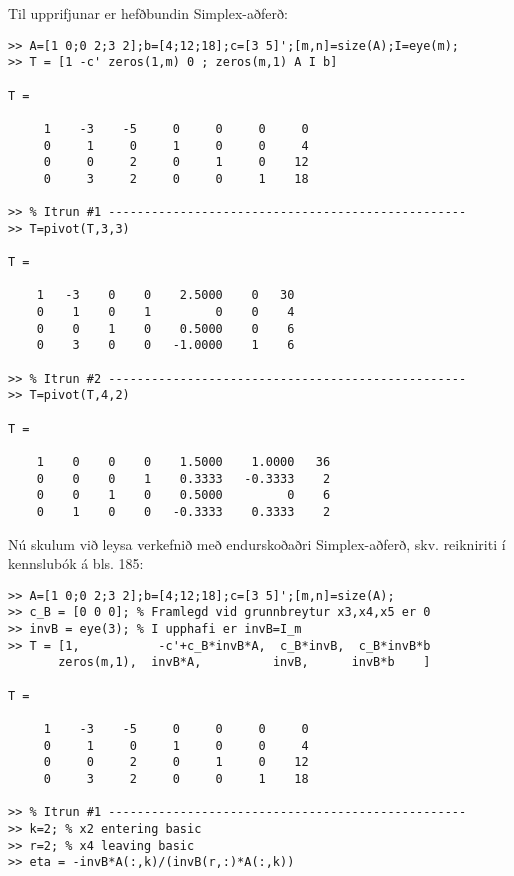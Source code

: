 \begin{lausn}

Til upprifjunar er hefðbundin Simplex-aðferð:
\begin{lstlisting}
>> A=[1 0;0 2;3 2];b=[4;12;18];c=[3 5]';[m,n]=size(A);I=eye(m);
>> T = [1 -c' zeros(1,m) 0 ; zeros(m,1) A I b]

T =

     1    -3    -5     0     0     0     0
     0     1     0     1     0     0     4
     0     0     2     0     1     0    12
     0     3     2     0     0     1    18

>> % Itrun #1 --------------------------------------------------
>> T=pivot(T,3,3) 

T =

    1   -3    0    0    2.5000    0   30
    0    1    0    1         0    0    4
    0    0    1    0    0.5000    0    6
    0    3    0    0   -1.0000    1    6

>> % Itrun #2 --------------------------------------------------
>> T=pivot(T,4,2) 

T =

    1    0    0    0    1.5000    1.0000   36
    0    0    0    1    0.3333   -0.3333    2
    0    0    1    0    0.5000         0    6
    0    1    0    0   -0.3333    0.3333    2
\end{lstlisting}
Nú skulum við leysa verkefnið með endurskoðaðri Simplex-aðferð, skv. reikni\-riti í kennslubók á bls. 185:
\begin{lstlisting}
>> A=[1 0;0 2;3 2];b=[4;12;18];c=[3 5]';[m,n]=size(A);
>> c_B = [0 0 0]; % Framlegd vid grunnbreytur x3,x4,x5 er 0 
>> invB = eye(3); % I upphafi er invB=I_m
>> T = [1,           -c'+c_B*invB*A,  c_B*invB,  c_B*invB*b  
       zeros(m,1),  invB*A,          invB,      invB*b    ]

T =

     1    -3    -5     0     0     0     0
     0     1     0     1     0     0     4
     0     0     2     0     1     0    12
     0     3     2     0     0     1    18

>> % Itrun #1 --------------------------------------------------
>> k=2; % x2 entering basic
>> r=2; % x4 leaving basic
>> eta = -invB*A(:,k)/(invB(r,:)*A(:,k))


\end{lstlisting}
\end{lausn}
